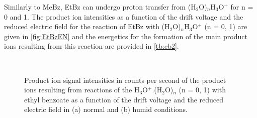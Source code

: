 Similarly to MeBz, EtBz can undergo proton transfer from (H$_2$O)$_n$H$_3$O$^+$ for n = 0 and 1.
%
The product ion intensities as a function of the drift voltage and the reduced electric field for the reaction of EtBz with (H$_2$O)$_n$H$_3$O$^+$ (n = 0, 1) are given in \autoref{fig:EtBzEN} and the energetics for the formation of the main product ions resulting from this reaction are provided in \autoref{tb:eb2}. 

\begin{figure}[htbp]
\centering
{}\\
\caption{Product ion signal intensities in counts per second of the product ions resulting from reactions of the H$_3$O$^+$.(H$_2$O)$_n$ (n = 0, 1) with ethyl benzoate as a function of the drift voltage and the reduced electric field in (a) normal and (b) humid conditions.}
\label{fig:EtBzEN}
\end{figure}


